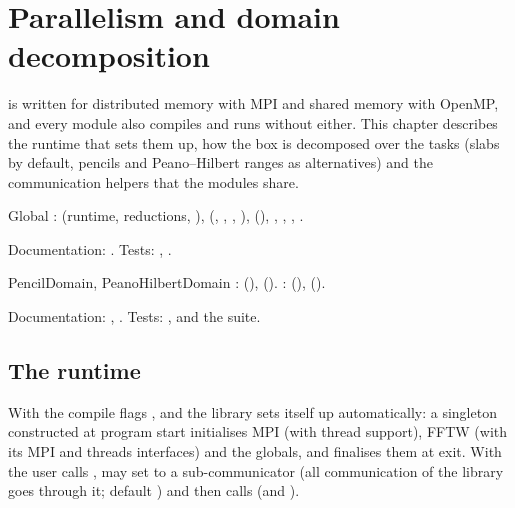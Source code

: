 \chapter{Parallelism and domain decomposition}\label{ch:parallelism}

\fml{} is written for distributed memory with MPI and shared memory with OpenMP, and every module also compiles and
runs without either. This chapter describes the runtime that sets them up, how the box is decomposed over the tasks
(slabs by default, pencils and Peano--Hilbert ranges as alternatives) and the communication helpers that the modules
share.

\begin{modulebox}{Global}
:  (runtime, reductions, ),  (,
, , ),  (),
, , ,
.\par
Documentation: . Tests: , .
\end{modulebox}
\begin{modulebox}{PencilDomain, PeanoHilbertDomain}
:  (), 
().
:  (),
 ().\par
Documentation: , . Tests: ,
 and the  suite.
\end{modulebox}

\section{The runtime}\label{sec:par-runtime}

With the compile flags ,  and  the library sets itself up automatically: a
singleton constructed at program start initialises MPI (with thread support), FFTW (with its MPI and threads interfaces)
and the globals, and finalises them at exit. With  the user calls , may set
 to a sub-communicator (all communication of the library goes through it; default
) and then calls  (and ).

